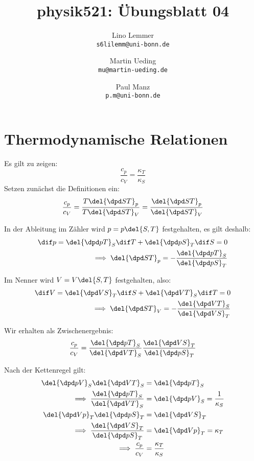 

\setcounter{section}{0}
\renewcommand\thesection{H\,4.\arabic{section}}
\renewcommand\thesubsection{\thesection.\alph{subsection}}

\title{physik521: Übungsblatt 04}
\author{%
    Lino Lemmer \\ \small{\texttt{s6lilemm@uni-bonn.de}}
    \and
    Martin Ueding \\ \small{\texttt{mu@martin-ueding.de}}
    \and
    Paul Manz \\ \small{\texttt{p.m@uni-bonn.de}}
}


\maketitle

\section{Thermodynamische Relationen}
Es gilt zu zeigen:
\[\frac{c_p}{c_V}=\frac{\kappa_T}{\kappa_S} \]
Setzen zunächst die Definitionen ein:
\begin{align*}
\frac{c_p}{c_V}=\frac{T \del{\dpd ST}_{p}}{T \del{\dpd ST}_V}= \frac{ \del{\dpd ST}_{p}}{ \del{\dpd ST}_V}\\
\end{align*}

In der Ableitung im Zähler wird $p=p\del{S,T}$ festgehalten, es gilt deshalb:
\begin{align*}
\dif p = \del{\dpd pT}_S \dif T + \del{\dpd pS}_T \dif S = 0 \\
\implies \del{\dpd ST}_p = -\frac{\del{\dpd pT}_S}{\del{\dpd pS}_T}
\end{align*}

Im Nenner wird $V=V\del{S,T}$ festgehalten, also:
\begin{align*}
\dif V = \del{\dpd VS}_T \dif S + \del{\dpd VT}_S \dif T = 0 \\
\implies \del{\dpd ST}_V = -\frac{\del{\dpd VT}_S}{\del{\dpd VS}_T} \\
\end{align*}

Wir erhalten als Zwischenergebnis:
\begin{align*}
\frac{c_p}{c_V}=\frac{\del{\dpd pT}_S}{\del{\dpd VT}_S} \frac{\del{\dpd VS}_T}{\del{\dpd pS}_T}
\end{align*}

Nach der Kettenregel gilt:
\begin{align*}
\del{\dpd pV}_S \del{\dpd VT}_S &= \del{\dpd pT}_S \\
\implies \frac{\del{\dpd pT}_S}{\del{\dpd VT}_S} &= \del{\dpd pV}_S =\frac{1}{\kappa_S} \\
\del{\dpd Vp}_T \del{\dpd pS}_T &= \del{\dpd VS}_T \\
\implies \frac{\del{\dpd VS}_T}{\del{\dpd pS}_T} &= \del{\dpd Vp}_T =\kappa_T \\
\implies \frac{c_p}{c_V} &= \frac{\kappa_T}{\kappa_S}
\end{align*}

